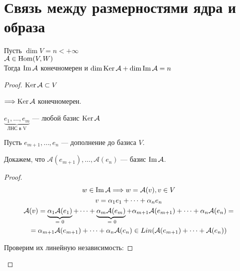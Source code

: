 
\section{Связь между размерностями ядра и образа}

\begin{theorem-non}

    Пусть $\dim V = n < +\infty$ \\
    $\mathcal{A} \in \operatorname{Hom}(V, W)$ \\
    Тогда $\operatorname{Im} \mathcal{A}$ конечномерен и
    $\dim \operatorname{Ker} \mathcal{A} + \dim \operatorname{Im} \mathcal{A} = n$

    \begin{proof}
        
        $\operatorname{Ker} \mathcal{A} \subset V$

        $\Longrightarrow \operatorname{Ker} \mathcal{A}$ конечномерен. 
        
        $\underbrace{e_1, \dots, e_m}_{\text{ЛНС в V}}$ --- любой базис $\operatorname{Ker} \mathcal{A}$

        Пусть $e_{m + 1}, \dots, e_n$ --- дополнение до базиса $V$.

        Докажем, что $\mathcal{A}(e_{m+1}), \dots, \mathcal{A}(e_n)$ ---
        базис $\operatorname{Im} \mathcal{A}$.

        \begin{proof}
            \begin{gather*}
                w \in \operatorname{Im} \mathcal{A} \Longrightarrow w = \mathcal{A}(v), v \in V \\    
                v = \alpha_1e_1 + \dots + \alpha_ne_n \\
                \mathcal{A}(v) =
                \underbrace{\alpha_1\mathcal{A}(e_1)}_{\text{ = 0 }} +
                \dots +
                \underbrace{\alpha_m\mathcal{A}(e_m)}_{\text{ = 0}} +
                \alpha_{m+1}\mathcal{A}(e_{m+1}) + \dots + \alpha_n\mathcal{A}(e_n) = \\
                = \alpha_{m+1}\mathcal{A}(e_{m+1}) + \dots + \alpha_n\mathcal{A}(e_n) \in Lin(\mathcal{A}(e_{m+1}) + \dots + \mathcal{A}(e_n)) \\ 
            \end{gather*}

            Проверим их линейную независимость:


\end{proof}
\end{proof}
\end{theorem-non}
